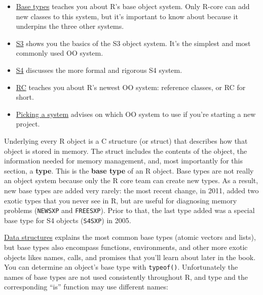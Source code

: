 \begin{itemize}
\item
  \hyperref[base-types]{Base types} teaches you about R's base object
  system. Only R-core can add new classes to this system, but it's
  important to know about because it underpins the three other systems.
\item
  \hyperref[s3]{S3} shows you the basics of the S3 object system. It's
  the simplest and most commonly used OO system.
\item
  \hyperref[s4]{S4} discusses the more formal and rigorous S4 system.
\item
  \hyperref[rc]{RC} teaches you about R's newest OO system: reference
  classes, or RC for short.
\item
  \hyperref[picking-a-system]{Picking a system} advises on which OO
  system to use if you're starting a new project.
\end{itemize}


Underlying every R object is a C structure (or struct) that describes
how that object is stored in memory. The struct includes the contents of
the object, the information needed for memory management, and, most
importantly for this section, a \textbf{type}. This is the \textbf{base
type} of an R object. Base types are not really an object system because
only the R core team can create new types. As a result, new base types
are added very rarely: the most recent change, in 2011, added two exotic
types that you never see in R, but are useful for diagnosing memory
problems (\texttt{NEWSXP} and \texttt{FREESXP}). Prior to that, the last
type added was a special base type for S4 objects (\texttt{S4SXP}) in
2005.   

\hyperref[data-structures]{Data structures} explains the most common
base types (atomic vectors and lists), but base types also encompass
functions, environments, and other more exotic objects likes names,
calls, and promises that you'll learn about later in the book. You can
determine an object's base type with \texttt{typeof()}. Unfortunately
the names of base types are not used consistently throughout R, and type
and the corresponding ``is'' function may use different names:

